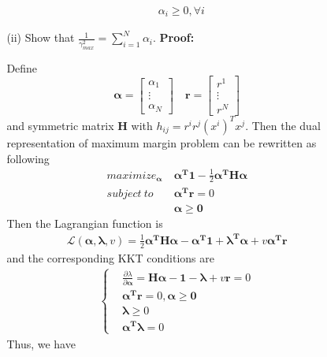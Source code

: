 \documentclass{article}
\renewcommand{\b}[1]{\bm{#1}}
\begin{document}
\begin{enumerate}
\begin{enumerate}
\begin{enumerate}
\begin{align*}
                &\alpha_i\geq 0,\forall i
            \end{align*}
            \item [(ii)] Show that $\frac{1}{\gamma_{max}^2}=\sum_{i=1}^N\alpha_i$.\newline
            {\bf Proof:}
            \par Define 
            \[\b{\alpha}=\begin{bmatrix}
                \alpha_1\\
                \vdots\\
                \alpha_N
            \end{bmatrix}\quad
            \b{r} = \begin{bmatrix}
                r^1\\
                \vdots\\
                r^N
            \end{bmatrix} \]
            and symmetric matrix $\b{H}$ with $h_{ij}=r^ir^j(x^i)^Tx^j$.
            Then the dual representation of maximum margin problem can be rewritten as following
            \begin{align*}
                maximize_{\b{\alpha}}\ &\b{\alpha^T 1}-\frac{1}{2}\b{\alpha^T H \alpha}\\
                subject\ to\ &\b{\alpha^T r} = 0\\
                &\b{\alpha}\geq \b{0}
            \end{align*}
            Then the Lagrangian function is 
            \begin{align*}
                \mathcal{L}(\b{\alpha}, \b{\lambda}, v) = \frac{1}{2}\b{\alpha^TH\alpha}-\b{\alpha^T 1} + \b{\lambda^T \alpha} + v\b{\alpha^Tr}
            \end{align*}
            and the corresponding KKT conditions are
            \begin{align*}
                \left\{\begin{aligned}
                    &\frac{\partial \mathcal{\lambda}}{\partial \b{\alpha}} = \b{H\alpha}-\b{1}-\b{\lambda}+v\b{r}=0\\
                    &\b{\alpha^T r} = 0, \b{\alpha}\geq \b{0}\\
                    &\b{\lambda} \geq 0\\
                    &\b{\alpha^T \lambda} = 0
                \end{aligned}\right.
            \end{align*}
            Thus, we have 

\end{enumerate}
\end{enumerate}
\end{enumerate}
\end{document}
